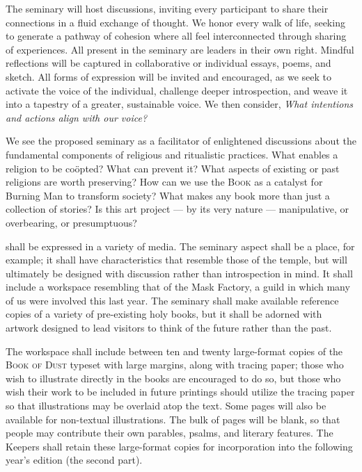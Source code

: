 \vv The seminary will host discussions, inviting every participant to share their connections in a fluid exchange of thought.
\vv We honor every walk of life, seeking to generate a pathway of cohesion where all feel interconnected through sharing of experiences.
\vv All present in the seminary are leaders in their own right.
\vv Mindful reflections will be captured in collaborative or individual essays, poems, and sketch.
\vv All forms of expression will be invited and encouraged, as we seek to activate the voice of the individual, challenge deeper introspection, and weave it into a tapestry of a greater, sustainable voice.
\vv We then consider, \textit{What intentions and actions align with our voice?}

\vv We see the proposed seminary as a facilitator of enlightened discussions about the fundamental components of religious and ritualistic practices.
\vv What enables a religion to be co\"opted? \vv What can prevent it? \vv What aspects of existing or past religions are worth preserving? \vv How can we use the \textsc{Book} as a catalyst for Burning Man to transform society? \vv What makes any book more than just a collection of stories? \vv Is this art project --- by its very nature --- manipulative, or overbearing, or presumptuous?

 shall be expressed in a variety of media.\footnotemarkmain{}
\vv The seminary aspect shall be a place, for example; \vv it shall have characteristics that resemble those of the temple, but \vv will ultimately be designed with discussion rather than introspection in mind. \vv It shall include a workspace resembling that of the Mask Factory, a guild in which many of us were involved this last year. \vv The seminary shall make available reference copies of a variety of pre-existing holy books, but \vv it shall be adorned with artwork designed to lead visitors to think of the future rather than the past.

\vv The workspace shall include between ten and twenty large-format copies of the \textsc{Book of Dust} typeset with large margins, along with tracing paper; \vv those who wish to illustrate directly in the books are encouraged to do so, but \vv those who wish their work to be included in future printings should utilize the tracing paper so that illustrations may be overlaid atop the text. \vv Some pages will also be available for non-textual illustrations. \vv The bulk of pages will be blank, so that people may contribute their own parables, psalms, and literary features.
\vv The Keepers shall retain these large-format copies for incorporation into the following year's edition (the second part).

